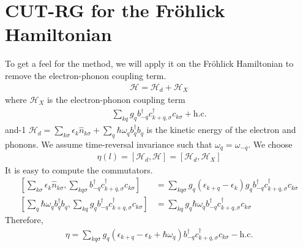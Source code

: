 \documentclass[twoside,11pt]{report}
\numberwithin{equation}{section}
\begin{document}
\section{CUT-RG for the Fröhlick Hamiltonian}
To get a feel for the method, we will apply it on the Fröhlick Hamiltonian to remove the electron-phonon coupling term. 
\begin{equation}\begin{aligned}
\mathcal{H} = \mathcal{H}_d + \mathcal{H}_X
\end{aligned}\end{equation}
where \(\mathcal{H}_X\) is the electron-phonon coupling term
\begin{equation}\begin{aligned}
\sum_{kq}g_{q}b^\dagger_{-q}c^\dagger_{k+q,\sigma}c_{k\sigma} + \text{h.c.}
\end{aligned}\end{equation}
and-1 \(\mathcal{H}_d = \sum_{k\sigma}\epsilon_k \hat n_{k\sigma} + \sum_q \hbar\omega_q b^\dagger_q b_q\) is the kinetic energy of the electron and phonons. We assume time-reversal invariance such that \(\omega_q = \omega_{-q}\). We choose
\begin{equation}\begin{aligned}
	\eta(l) = \left[\mathcal{H}_d,\mathcal{H}\right] = \left[\mathcal{H}_d,\mathcal{H}_X\right]
\end{aligned}\end{equation}
It is easy to compute the commutators.
\begin{equation}\begin{aligned}
	\left[\sum_{k\sigma}\epsilon_k \hat n_{k\sigma},\sum_{kq\sigma}b^\dagger_{-q}c^\dagger_{k+q,\sigma}c_{k\sigma}\right]  &= \sum_{kq\sigma}g_q\left(\epsilon_{k+q} - \epsilon_k\right)g_qb^\dagger_{-q}c^\dagger_{k+q,\sigma}c_{k\sigma}\\
	\left[\sum_{q}\hbar \omega_q b^\dagger_q b_q,\sum_{kq}g_{q}b^\dagger_{-q}c^\dagger_{k+q,\sigma}c_{k\sigma}\right]  &= \sum_{kq}g_q \hbar \omega_q b^\dagger_{-q}c^\dagger_{k+q,\sigma}c_{k\sigma}
\end{aligned}\end{equation}
Therefore,
\begin{equation}\begin{aligned}
	\eta =\sum_{kq\sigma}g_q\left(\epsilon_{k+q} - \epsilon_k + \hbar\omega_q\right)b^\dagger_{-q}c^\dagger_{k+q,\sigma}c_{k\sigma} - \text{h.c.}
\end{aligned}\end{equation}
\end{document}

